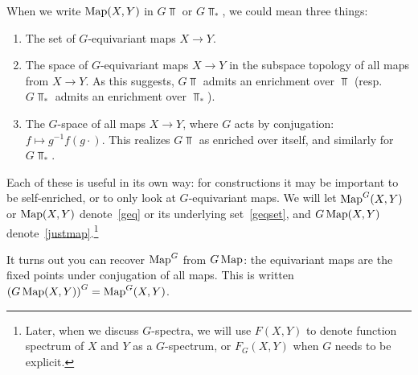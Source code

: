 When we write $\operatorname{Map}(X, Y)$ in $G\Top$ or $G\Top_*$, we could mean three things:
\begin{enumerate}
	\item\label{geqset} The set of $G$-equivariant maps $X\to Y$.
	\item\label{geq} The space of $G$-equivariant maps $X\to Y$ in the subspace topology of all maps from $X\to Y$.
	As this suggests, $G\Top$ admits an enrichment over $\Top$ (resp.\ $G\Top_*$ admits an enrichment over
	$\Top_*$).
	\item\label{justmap} The $G$-space of all maps $X\to Y$, where $G$ acts by conjugation: $f\mapsto
	g^{-1}f(g\cdot)$. This realizes $G\Top$ as enriched over itself, and similarly for $G\Top_*$.
\end{enumerate}
Each of these is useful in its own way: for constructions it may be important to be self-enriched, or to only look
at $G$-equivariant maps. We will let $\operatorname{Map}^G(X,Y)$ or $\operatorname{Map}(X,Y)$ denote~\eqref{geq} or its underlying
set~\eqref{geqset}, and $G\operatorname{Map}(X,Y)$ denote~\eqref{justmap}.\footnote{Later, when we discuss $G$-spectra, we will
use $F(X, Y)$ to denote function spectrum of $X$ and $Y$ as a $G$-spectrum, or $F_G(X,Y)$ when $G$ needs to be
explicit.}

It turns out you can recover $\operatorname{Map}^G$ from $G\operatorname{Map}$: the equivariant maps are the fixed points under conjugation of
all maps. This is written $\left(G\operatorname{Map}(X,Y)\right)^G = \operatorname{Map}^G(X,Y)$.

